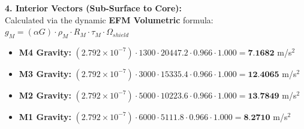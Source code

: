 \documentclass[11pt, a4paper]{article}
\begin{document}
  \vspace{0.5em}
  \noindent \textbf{4. Interior Vectors (Sub-Surface to Core):} \\[0.5em]
  \hspace*{1em} Calculated via the dynamic \textbf{EFM Volumetric} formula: $g_M = (\alpha G) \cdot \rho_{M} \cdot R_M \cdot \tau_M \cdot \Omega_{shield}$
  \begin{itemize}
    \item \textbf{M4 Gravity:} $(2.792 \times 10^{-7}) \cdot 1300 \cdot 20447.2 \cdot 0.966 \cdot 1.000 = \textbf{7.1682}$ m/s$^2$
    \item \textbf{M3 Gravity:} $(2.792 \times 10^{-7}) \cdot 3000 \cdot 15335.4 \cdot 0.966 \cdot 1.000 = \textbf{12.4065}$ m/s$^2$
    \item \textbf{M2 Gravity:} $(2.792 \times 10^{-7}) \cdot 5000 \cdot 10223.6 \cdot 0.966 \cdot 1.000 = \textbf{13.7849}$ m/s$^2$
    \item \textbf{M1 Gravity:} $(2.792 \times 10^{-7}) \cdot 6000 \cdot 5111.8 \cdot 0.966 \cdot 1.000 = \textbf{8.2710}$ m/s$^2$
  \end{itemize}
\end{document}
